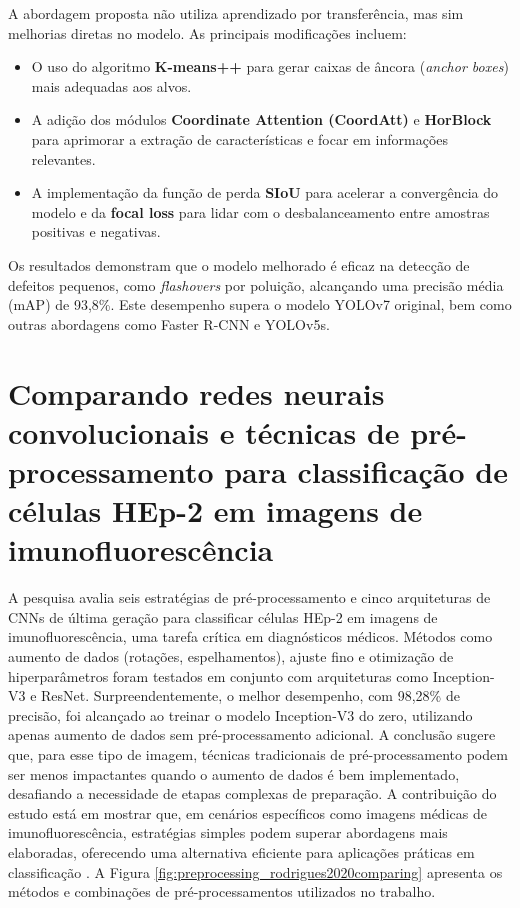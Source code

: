 A abordagem proposta não utiliza aprendizado por transferência, mas sim melhorias diretas no modelo. As principais modificações incluem:
\begin{itemize}
    \item O uso do algoritmo \textbf{K-means++} para gerar caixas de âncora (\textit{anchor boxes}) mais adequadas aos alvos.
    \item A adição dos módulos \textbf{Coordinate Attention (CoordAtt)} e \textbf{HorBlock} para aprimorar a extração de características e focar em informações relevantes.
    \item A implementação da função de perda \textbf{SIoU} para acelerar a convergência do modelo e da \textbf{focal loss} para lidar com o desbalanceamento entre amostras positivas e negativas.
\end{itemize}

Os resultados demonstram que o modelo melhorado é eficaz na detecção de defeitos pequenos, como \textit{flashovers} por poluição, alcançando uma precisão média (mAP) de 93,8\%. Este desempenho supera o modelo YOLOv7 original, bem como outras abordagens como Faster R-CNN e YOLOv5s.

\section{Comparando redes neurais convolucionais e técnicas de pré- processamento para classificação de células HEp-2 em imagens de imunofluorescência}
A pesquisa avalia seis estratégias de pré-processamento e cinco arquiteturas de CNNs de última geração para classificar células HEp-2 em imagens de imunofluorescência, uma tarefa crítica em diagnósticos médicos. Métodos como aumento de dados (rotações, espelhamentos), ajuste fino e otimização de hiperparâmetros foram testados em conjunto com arquiteturas como Inception-V3 e ResNet. Surpreendentemente, o melhor desempenho, com 98,28\% de precisão, foi alcançado ao treinar o modelo Inception-V3 do zero, utilizando apenas aumento de dados sem pré-processamento adicional. A conclusão sugere que, para esse tipo de imagem, técnicas tradicionais de pré-processamento podem ser menos impactantes quando o aumento de dados é bem implementado, desafiando a necessidade de etapas complexas de preparação. A contribuição do estudo está em mostrar que, em cenários específicos como imagens médicas de imunofluorescência, estratégias simples podem superar abordagens mais elaboradas, oferecendo uma alternativa eficiente para aplicações práticas em classificação \cite{rodrigues2020comparing}.
A Figura \ref{fig:preprocessing_rodrigues2020comparing} apresenta os métodos e combinações de pré-processamentos utilizados no trabalho.


